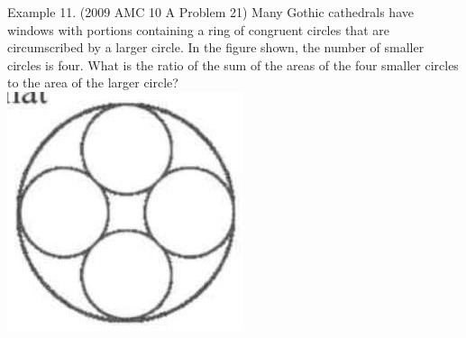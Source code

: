 \documentclass[10pt]{article}
\begin{document}
Example 11. (2009 AMC 10 A Problem 21) Many Gothic cathedrals have windows with portions containing a ring of congruent circles that are circumscribed by a larger circle. In the figure shown, the number of smaller circles is four. What is the ratio of the sum of the areas of the four smaller circles to the area of the larger circle?\\
\includegraphics[max width=\textwidth, center]{2025_04_17_97bc1f7e44d93c271a88g-182(1)}
\end{document}
